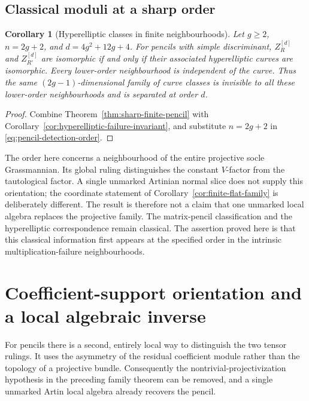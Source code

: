 \documentclass[11pt,reqno]{amsart}
\numberwithin{equation}{section}
\newtheorem{corollary}[theorem]{Corollary}
\theoremstyle{definition}\newtheorem{definition}[theorem]{Definition}
\theoremstyle{remark}\newtheorem{remark}[theorem]{Remark}
\begin{document}
\subsection{Classical moduli at a sharp order}

\begin{corollary}[Hyperelliptic classes in finite neighbourhoods]
\label{cor:finite-hyperelliptic}
Let \(g\ge2\), \(n=2g+2\), and
\(d=4g^2+12g+4\).  For pencils with simple discriminant,
\(Z_R^{[d]}\) and \(Z_{R'}^{[d]}\) are isomorphic if
and only if their associated hyperelliptic curves are isomorphic.
Every lower-order neighbourhood is independent of the curve.
Thus the same \((2g-1)\)-dimensional family of curve classes
is invisible to all these lower-order neighbourhoods and is
separated at order \(d\).
\end{corollary}
\begin{proof}
Combine Theorem~\ref{thm:sharp-finite-pencil} with
Corollary~\ref{cor:hyperelliptic-failure-invariant}, and substitute
\(n=2g+2\) in \eqref{eq:pencil-detection-order}.
\end{proof}

The order here concerns a neighbourhood of the entire projective
socle Grassmannian.  Its global ruling distinguishes the constant
\(V\)-factor from the tautological factor.  A single unmarked
Artinian normal slice does not supply this orientation; the
coordinate statement of Corollary~\ref{cor:finite-flat-family}
is deliberately different.  The result is therefore not a claim
that one unmarked local algebra replaces the projective family.
The matrix-pencil classification and the hyperelliptic
correspondence remain classical.  The assertion proved here is
that this classical information first appears at the specified
order in the intrinsic multiplication-failure neighbourhoods.

\section{Coefficient-support orientation and a local algebraic inverse}
\label{sec:local-inverse-v146}

For pencils there is a second, entirely local way to distinguish the
two tensor rulings.  It uses the asymmetry of the residual coefficient
module rather than the topology of a projective bundle.  Consequently
the nontrivial-projectivization hypothesis in the preceding family
theorem can be removed, and a single unmarked Artin local algebra
already recovers the pencil.
\end{document}
